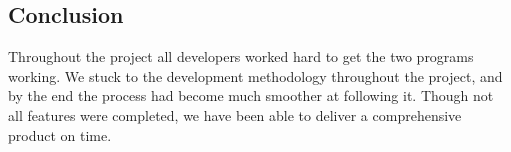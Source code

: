 \subsection{Conclusion}

Throughout the project all developers worked hard to get the two programs working. We stuck to the development methodology throughout the project, and by the end the process had become much smoother at following it. Though not all features were completed, we have been able to deliver a comprehensive product on time.

